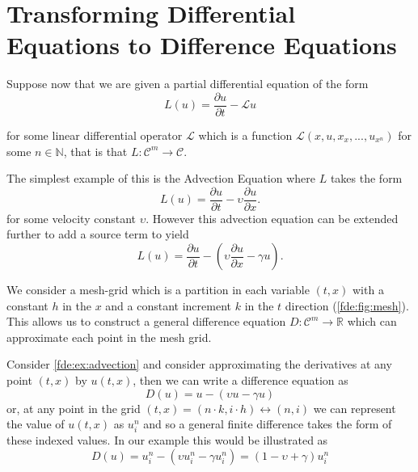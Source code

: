 \documentclass[../main.tex]{subfiles}
\begin{document}
  \section{Transforming Differential Equations to Difference Equations}
  Suppose now that we are given a partial differential equation of the form\\

  \begin{equation}
    L(u) = \frac{\partial u}{\partial t} - \mathcal{L}u
  \end{equation}

  for some linear differential operator $\mathcal{L}$ which is a function $\mathcal{L}(x, u, x_x, ..., u_{x^n})$ for some $n \in \mathbb{N}$, that is that $L :  \mathcal{C}^m \to \mathcal{C}$.

  \begin{example}\label{fde:ex:advection}
    The simplest example of this is the Advection Equation where $L$ takes the form
    \begin{equation}
      L(u) = \frac{\partial u}{\partial t} - \upsilon \frac{\partial u}{\partial x}.
    \end{equation}
    for some velocity constant $\upsilon$. However this advection equation can be extended further to add a source term to yield
    \begin{equation}
      L(u) = \frac{\partial u}{\partial t} - \left(\upsilon \frac{\partial u}{\partial x} - \gamma u \right).
    \end{equation}
  \end{example}


  We consider a mesh-grid which is a partition in each variable $(t, x)$ with a constant $h$ in the $x$ and a constant increment $k$ in the $t$ direction (\autoref{fde:fig:mesh}). This allows us to construct a general difference equation $D: \mathcal{C}^m \to \mathbb{R}$ which can approximate each point in the mesh grid.

  \begin{example}
    Consider \autoref{fde:ex:advection} and consider approximating the derivatives at any point $(t, x)$ by $u(t, x)$, then we can write a difference equation as
    \begin{equation}
      D(u) = u - (\upsilon u - \gamma u)
    \end{equation}
    or, at any point in the grid $(t, x) = (n \cdot k, i \cdot h) \leftrightarrow (n, i)$ we can represent the value of $u(t, x)$ as $u_i^n$ and so a general finite difference takes the form of these indexed values. In our example this would be illustrated as
    \begin{equation}
      D(u) = u^n_i - (\upsilon u^n_i - \gamma u_i^n) = (1 - \upsilon + \gamma) u_i^n
    \end{equation}

  \end{example}
\end{document}
